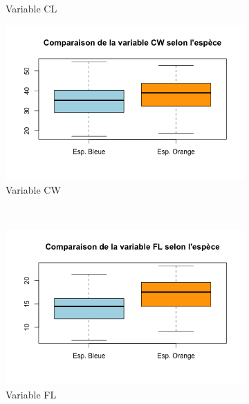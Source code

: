 \documentclass[a4paper,10pt]{report}
\begin{document}
\begin{figure}[H]
\begin{subfigure}[b]{0.3\linewidth}
		\caption{\scriptsize Variable CL}
		\label{fig:1_2_1_espece_cl}
	\end{subfigure}%
	\begin{subfigure}[b]{0.3\linewidth}
		\centering
		\captionsetup{justification=centering, margin=1cm}
		\includegraphics[width=1\linewidth]{img/1-2-1-espece-cw.png}
		\caption{\scriptsize Variable CW}
		\label{fig:1_2_1_espece_cw}
	\end{subfigure}%
	\\
	\begin{subfigure}[b]{0.3\linewidth}
		\centering
		\captionsetup{justification=centering, margin=1cm}
		\includegraphics[width=1\linewidth]{img/1-2-1-espece-fl.png}
		\caption{\scriptsize Variable FL}
		\label{fig:1_2_1_espece_fl}
	\end{subfigure}%
	\begin{subfigure}[b]{0.3\linewidth}
		\centering
		\captionsetup{justification=centering, margin=1cm}

\end{subfigure}
\end{figure}
\end{document}
